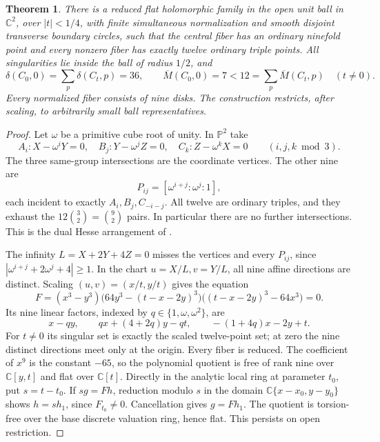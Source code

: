 \documentclass[11pt]{article}
\newtheorem{theorem}{Theorem}
\newcommand{\rough}{\overline M}
\newcommand{\C}{\mathbb C}
\begin{document}
\begin{theorem}\label{thm}
There is a reduced flat holomorphic family in the open unit ball in
\(\C^2\), over \(|t|<1/4\), with finite simultaneous normalization and smooth
disjoint transverse boundary circles, such that the central fiber has an
ordinary ninefold point and every nonzero fiber has exactly twelve ordinary
triple points. All singularities lie inside the ball of radius \(1/2\), and
\[
 \delta(C_0,0)=\sum_p\delta(C_t,p)=36,\qquad
 \rough(C_0,0)=7<12=\sum_p\rough(C_t,p)\quad(t\ne0).
\]
Every normalized fiber consists of nine disks. The construction restricts,
after scaling, to arbitrarily small ball representatives.
\end{theorem}

\begin{proof}
Let \(\omega\) be a primitive cube root of unity. In \(\mathbb P^2\) take
\[
 A_i:X-\omega^iY=0,\quad B_j:Y-\omega^jZ=0,\quad
 C_k:Z-\omega^kX=0\qquad(i,j,k\bmod3).
\]
The three same-group intersections are the coordinate vertices. The other
nine are
\[
 P_{ij}=[\omega^{i+j}:\omega^j:1],
\]
each incident to exactly
\(A_i,B_j,C_{-i-j}\). All twelve are ordinary triples, and they exhaust
the \(12\binom32=\binom92\) pairs. In particular there are no further
intersections. This is the dual Hesse arrangement of \cite{DvS}.

The infinity \(L=X+2Y+4Z=0\) misses the vertices and every \(P_{ij}\),
since \(|\omega^{i+j}+2\omega^j+4|\ge1\).
In the chart \(u=X/L,v=Y/L\), all nine affine directions are distinct.
Scaling \((u,v)=(x/t,y/t)\) gives the equation
\begin{equation}\label{F}
 F=(x^3-y^3)\bigl(64y^3-(t-x-2y)^3\bigr)
              \bigl((t-x-2y)^3-64x^3\bigr)=0.
\end{equation}
Its nine linear factors, indexed by \(q\in\{1,\omega,\omega^2\}\), are
\[
 x-qy,\qquad qx+(4+2q)y-qt,\qquad -(1+4q)x-2y+t.
\]
For \(t\ne0\) its singular set is exactly the scaled twelve-point set;
at zero the nine distinct directions meet only at the origin. Every fiber
is reduced. The coefficient of \(x^9\) is the constant \(-65\), so the
polynomial quotient is free of rank nine over \(\C[y,t]\) and flat over
\(\C[t]\). Directly in the analytic local ring at parameter \(t_0\),
put \(s=t-t_0\). If \(sg=Fh\), reduction modulo \(s\) in the domain
\(\C\{x-x_0,y-y_0\}\) shows \(h=sh_1\), since \(F_{t_0}\ne0\).
Cancellation gives \(g=Fh_1\). The quotient is torsion-free over the
base discrete valuation ring, hence flat. This persists on open restriction.


\end{proof}
\end{document}
